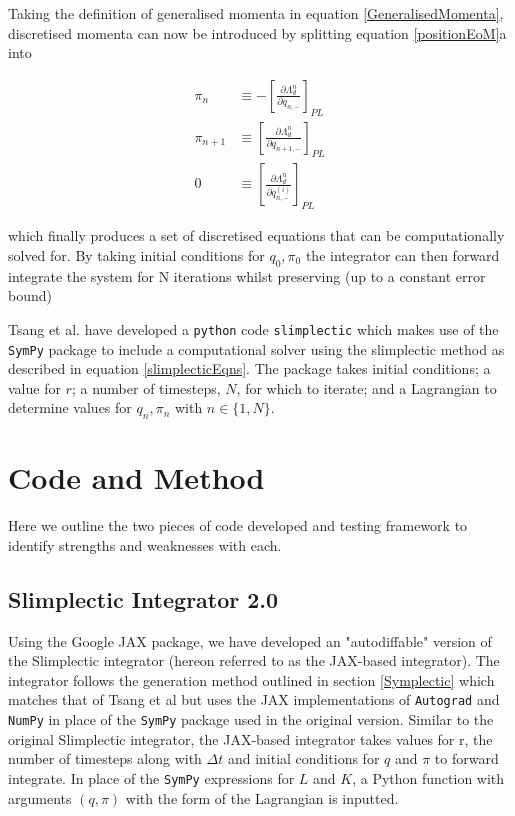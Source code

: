 \documentclass[10pt]{iopart}
\begin{document}
Taking the definition of generalised momenta in equation \ref{GeneralisedMomenta}, discretised momenta can now be introduced by splitting equation \ref{positionEoM}a into 

\begin{subequations}
\label{slimplecticEqns}
\begin{align}
\pi_n &\equiv -\left[\frac{\partial\Lambda_d^n}{\partial q_{n,-}}\right]_{PL} \\
\pi_{n+1} &\equiv \left[\frac{\partial\Lambda_d^n}{\partial q_{n+1,-}}\right]_{PL} \\ 
0 &\equiv \left[\frac{\partial\Lambda_d^n}{\partial q_{n,-}^{(i)}}\right]_{PL}
\end{align}
\end{subequations}

which finally produces a set of discretised equations that can be computationally solved for. By taking initial conditions for $q_0, \pi_0$ the integrator can then forward integrate the system for N iterations whilst preserving (up to a constant error bound) 

Tsang et al. \cite{Tsang_Slimplectic} have developed a \texttt{python} code \texttt{slimplectic} which makes use of the \texttt{SymPy} package to include a computational solver using the slimplectic method as described in equation \ref{slimplecticEqns}. The package takes initial conditions; a value for $r$; a number of timesteps, $N$, for which to iterate; and a Lagrangian to determine values for $q_n,\pi_n$ with $n\in\{1,N\}$.


\section{Code and Method}
Here we outline the two pieces of code developed and testing framework to identify strengths and weaknesses with each. 

\subsection{Slimplectic Integrator 2.0}
\label{SI2.0}
Using the Google JAX package, we have developed an "autodiffable" version of the Slimplectic integrator (hereon referred to as the JAX-based integrator). The integrator follows the generation method outlined in section \ref{Symplectic} which matches that of Tsang et al \cite{Tsang_Slimplectic} but uses the JAX implementations of \texttt{Autograd} and \texttt{NumPy} in place of the \texttt{SymPy} package used in the original version. Similar to the original Slimplectic integrator, the JAX-based integrator takes values for r, the number of timesteps along with $\Delta t$ and initial conditions for $q$ and $\pi$ to forward integrate. In place of the \texttt{SymPy} expressions for $L$ and $K$, a Python function with arguments $(q,\pi)$ with the form of the Lagrangian is inputted. 
\end{document}
